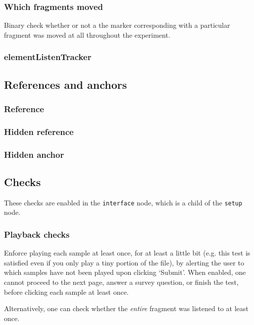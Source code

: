 \documentclass[11pt, oneside]{article}   	%
\begin{document}
		\subsubsection{Which fragments moved}
			Binary check whether or not a the marker corresponding with a particular fragment was moved at all throughout the experiment. 

		\subsubsection{elementListenTracker} %

	\subsection{References and anchors}
		\subsubsection{Reference}
		\subsubsection{Hidden reference} 
		\subsubsection{Hidden anchor}

	\subsection{Checks}
		\label{sec:checks}

		These checks are enabled in the \texttt{interface} node, which is a child of the \texttt{setup} node. 
		\subsubsection{Playback checks}
				Enforce playing each sample at least once, for at least a little bit (e.g. this test is satisfied even if you only play a tiny portion of the file), by alerting the user to which samples have not been played upon clicking `Submit'. When enabled, one cannot proceed to the next page, answer a survey question, or finish the test, before clicking each sample at least once. 

				Alternatively, one can check whether the \emph{entire} fragment was listened to at least once. 
\end{document}
